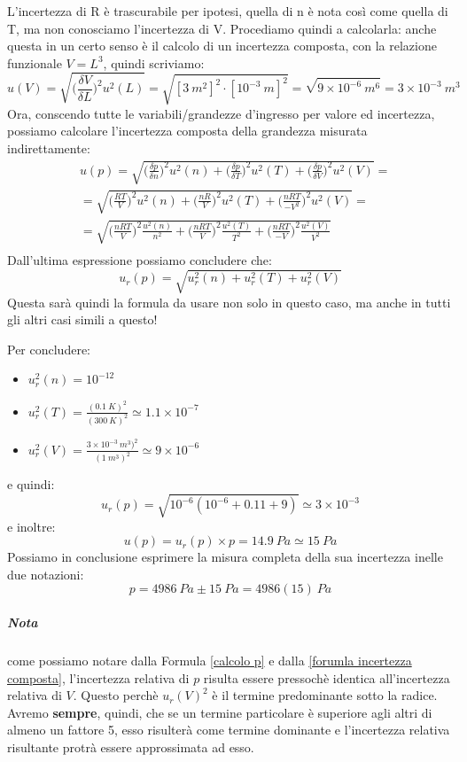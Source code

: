 \documentclass[a4paper,11pt]{report}
\begin{document}
L'incertezza di R è trascurabile per ipotesi, quella di n è nota così come quella di T, ma non conosciamo l'incertezza di V. Procediamo quindi a calcolarla: anche questa in un certo senso è il calcolo di un incertezza composta, con la relazione funzionale $ V = L^3 $, quindi scriviamo:
$$
  u(V) = \sqrt{\Bigg(\frac{\delta V}{\delta L}\Bigg)^2 u^2(L)} = \sqrt{[3~m^2]^2\cdot[10^{-3}~m]^2} = \sqrt{9\times 10^{-6}~m^6} = 3\times 10^{-3}~ m^3
$$
Ora, conscendo tutte le variabili/grandezze d'ingresso per valore ed incertezza, possiamo calcolare l'incertezza composta della grandezza misurata indirettamente:
\begin{align*}
&u(p) = \sqrt{\Bigg(\frac{\delta p}{\delta n}\Bigg)^2 u^2(n)+\Bigg(\frac{\delta p}{\delta T}\Bigg)^2 u^2(T)+\Bigg(\frac{\delta p}{\delta V}\Bigg)^2 u^2(V)} =\\
&= \sqrt{\Bigg(\frac{RT}{V}\Bigg)^2 u^2(n)+\Bigg(\frac{nR}{V}\Bigg)^2 u^2(T)+\Bigg(\frac{nRT}{-V^2}\Bigg)^2 u^2(V)} =\\
&= \sqrt{\Bigg(\frac{nRT}{V}\Bigg)^2 \frac{u^2(n)}{n^2}+\Bigg(\frac{nRT}{V}\Bigg)^2 \frac{u^2(T)}{T^2}+\Bigg(\frac{nRT}{-V}\Bigg)^2 \frac{u^2(V)}{V^2}}\\
\end{align*}
Dall'ultima espressione possiamo concludere che:
\begin{equation}
\label{formula incertezza composta}
  u_r(p) = \sqrt{u_r^2(n)+u_r^2(T)+u_r^2(V)}
\end{equation}
Questa sarà quindi la formula da usare non solo in questo caso, ma anche in tutti gli altri casi simili a questo!

Per concludere:
\begin{itemize}
  \item $u_r^2(n) = 10^{-12}$
  \item $u_r^2(T) = \frac{(0.1~K)^2}{(300~K)^2} \simeq 1.1\times 10^{-7}$
  \item $u_r^2(V) = \frac{3\times 10^{-3}~ m^3)^2}{(1~m^3)^2} \simeq 9\times 10^{-6}$
\end{itemize}
e quindi:
\begin{equation}
  \label{calcolo p}
  u_r(p) = \sqrt{10^{-6}(10^{-6}+0.11+9)} \simeq 3\times 10^{-3}
\end{equation}
e inoltre:
$$
  u(p) = u_r(p)\times p = 14.9~ Pa \simeq 15~Pa
$$
Possiamo in conclusione esprimere la misura completa della sua incertezza inelle due notazioni:
$$
  p = 4986~ Pa\pm 15~ Pa = 4986(15)~ Pa
$$
\subparagraph{Nota} come possiamo notare dalla Formula \ref{calcolo p} e dalla \ref{forumla incertezza composta}, l'incertezza relativa di $p$ risulta essere pressochè identica all'incertezza relativa di $V$. Questo perchè $u_r(V)^2$ è il termine predominante sotto la radice. Avremo \textbf{sempre}, quindi, che se un termine particolare è superiore agli altri di almeno un fattore 5, esso risulterà come termine dominante e l'incertezza relativa risultante protrà essere approssimata ad esso.
\end{document}
